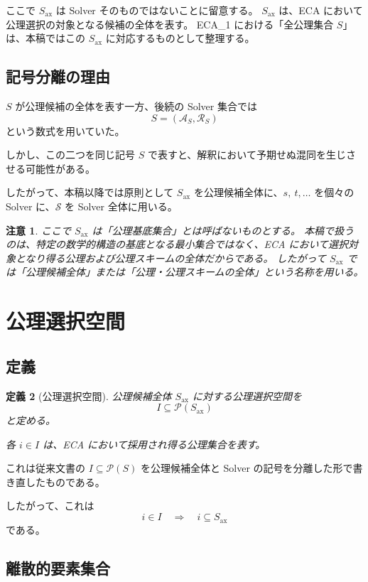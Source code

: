 \documentclass[a4paper,11pt]{article}
\newtheorem{definition}{定義}[section]
\newtheorem{remark}[definition]{注意}
\newcommand{\Solver}{\mathcal{S}}
\newcommand{\Ax}{S_{\mathrm{ax}}}
\newcommand{\Sel}{I}
\begin{document}
ここで $\Ax$ は Solver そのものではないことに留意する。
$\Ax$ は、ECA において公理選択の対象となる候補の全体を表す。
ECA_1 における「全公理集合 $S$」は、本稿ではこの $\Ax$ に対応するものとして整理する。

\subsection{記号分離の理由}
$S$ が公理候補の全体を表す一方、後続の Solver 集合では
\[
S=(\mathcal{A}_S,\mathcal{R}_S)
\]
という数式を用いていた。

しかし、この二つを同じ記号 $S$ で表すと、解釈において予期せぬ混同を生じさせる可能性がある。

したがって、本稿以降では原則として $\Ax$ を公理候補全体に、$s,\ t,\ldots$ を個々の Solver に、$\Solver$ を Solver 全体に用いる。

\begin{remark}
ここで $\Ax$ は「公理基底集合」とは呼ばないものとする。
本稿で扱うのは、特定の数学的構造の基底となる最小集合ではなく、ECA において選択対象となり得る公理および公理スキームの全体だからである。
したがって $\Ax$ では「公理候補全体」または「公理・公理スキームの全体」という名称を用いる。
\end{remark}

\section{公理選択空間}

\subsection{定義}

\begin{definition}[公理選択空間]
公理候補全体 $\Ax$ に対する公理選択空間を
\[
\boxed{\Sel\subseteq\mathcal{P}(\Ax)}
\]
と定める。

各 $i\in\Sel$ は、ECA において採用され得る公理集合を表す。
\end{definition}

これは従来文書の $I\subseteq\mathcal{P}(S)$ を公理候補全体と Solver の記号を分離した形で書き直したものである。

したがって、これは
\[
i\in\Sel
\quad\Longrightarrow\quad
i\subseteq\Ax
\]
である。

\subsection{離散的要素集合}
\end{document}
